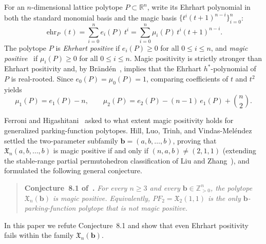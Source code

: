 \documentclass[11pt,letterpaper]{article}
\theoremstyle{result}
\theoremstyle{remark}
\newcommand{\ZZ}{\mathbb{Z}}
\newcommand{\RR}{\mathbb{R}}
\newcommand{\X}{\mathfrak{X}}
\newcommand{\vb}{\mathbf{b}}
\newcommand{\ehr}{\operatorname{ehr}}
\begin{document}
For an $n$-dimensional lattice polytope $P\subset\RR^n$, write its Ehrhart polynomial in both the standard monomial basis and the magic basis $\{t^i(t+1)^{n-i}\}_{i=0}^n$:
\[
\ehr_P(t) = \sum_{i=0}^n e_i(P)\,t^i = \sum_{i=0}^n \mu_i(P)\,t^i(t+1)^{n-i}.
\]
The polytope $P$ is \emph{Ehrhart positive} if $e_i(P)\ge 0$ for all $0\le i\le n$, and \emph{magic positive}~\cite{FH24} if $\mu_i(P)\ge 0$ for all $0\le i\le n$. Magic positivity is strictly stronger than Ehrhart positivity and, by Br\"and\'en~\cite[Theorem~4.2]{Bra06}, implies that the Ehrhart $h^*$-polynomial of $P$ is real-rooted. Since $e_0(P)=\mu_0(P)=1$, comparing coefficients of $t$ and $t^2$ yields
\begin{equation}\label{eq:mu2}
\mu_1(P) = e_1(P) - n,
\qquad
\mu_2(P) = e_2(P) - (n-1)\,e_1(P) + \binom{n}{2}.
\end{equation}

Ferroni and Higashitani~\cite[Problem~4.23]{FH24} asked to what extent magic positivity holds for generalized parking-function polytopes. Hill, Luo, Trinh, and Vindas-Mel\'endez~\cite[Theorem~7.2]{HLTV26} settled the two-parameter subfamily $\vb=(a,b,\dots,b)$, proving that $\X_n(a,b,\dots,b)$ is magic positive if and only if $(n,a,b)\ne(2,1,1)$ (extending the stable-range partial permutohedron classification of Liu and Zhang~\cite[Theorem~1.3]{LZ26}), and formulated the following general conjecture.

\begin{quote}
\textbf{Conjecture~8.1 of~\cite{HLTV26}.} \emph{For every $n\ge 3$ and every $\vb\in\ZZ_{>0}^n$, the polytope $\X_n(\vb)$ is magic positive. Equivalently, $PF_2=\X_2(1,1)$ is the only $\vb$-parking-function polytope that is not magic positive.}
\end{quote}

In this paper we refute Conjecture~8.1 and show that even Ehrhart positivity fails within the family $\X_n(\vb)$.
\end{document}
